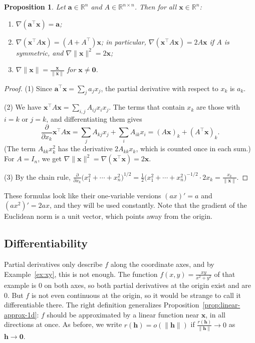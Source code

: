 \documentclass[11pt]{article}
\newcommand{\norm}[1]{\lVert #1 \rVert}
\theoremstyle{definition}
\theoremstyle{plain}
\newtheorem{proposition}[definition]{Proposition}
\theoremstyle{remark}
\begin{document}
\begin{proposition}\label{prop:basic-gradients}
    Let $\mathbf{a} \in \mathbb{R}^n$ and $A \in \mathbb{R}^{n \times n}$. Then for all $\mathbf{x} \in \mathbb{R}^n$:
    \begin{enumerate}
        \item $\nabla (\mathbf{a}^\top \mathbf{x}) = \mathbf{a}$;
        \item $\nabla (\mathbf{x}^\top A \mathbf{x}) = (A + A^\top)\mathbf{x}$; in particular, $\nabla (\mathbf{x}^\top A \mathbf{x}) = 2A\mathbf{x}$ if $A$ is symmetric, and $\nabla \norm{\mathbf{x}}^2 = 2\mathbf{x}$;
        \item $\nabla \norm{\mathbf{x}} = \frac{\mathbf{x}}{\norm{\mathbf{x}}}$ for $\mathbf{x} \neq \mathbf{0}$.
    \end{enumerate}
\end{proposition}

\begin{proof}
    (1) Since $\mathbf{a}^\top \mathbf{x} = \sum_j a_j x_j$, the partial derivative with respect to $x_k$ is $a_k$.

    (2) We have $\mathbf{x}^\top A \mathbf{x} = \sum_{i, j} A_{ij} x_i x_j$. The terms that contain $x_k$ are those with $i = k$ or $j = k$, and differentiating them gives
    \[\frac{\partial}{\partial x_k} \mathbf{x}^\top A \mathbf{x} = \sum_j A_{kj} x_j + \sum_i A_{ik} x_i = (A\mathbf{x})_k + (A^\top \mathbf{x})_k.\]
    (The term $A_{kk} x_k^2$ has the derivative $2A_{kk} x_k$, which is counted once in each sum.) For $A = I_n$, we get $\nabla \norm{\mathbf{x}}^2 = \nabla(\mathbf{x}^\top \mathbf{x}) = 2\mathbf{x}$.

    (3) By the chain rule, $\frac{\partial}{\partial x_k} \big(x_1^2 + \cdots + x_n^2\big)^{1/2} = \frac{1}{2} \big(x_1^2 + \cdots + x_n^2\big)^{-1/2} \cdot 2x_k = \frac{x_k}{\norm{\mathbf{x}}}$.
\end{proof}

These formulas look like their one-variable versions $(ax)' = a$ and $(ax^2)' = 2ax$, and they will be used constantly. Note that the gradient of the Euclidean norm is a unit vector, which points away from the origin.

\subsection{Differentiability}

Partial derivatives only describe $f$ along the coordinate axes, and by Example~\ref{ex:xy}, this is not enough. The function $f(x, y) = \frac{xy}{x^2 + y^2}$ of that example is $0$ on both axes, so both partial derivatives at the origin exist and are $0$. But $f$ is not even continuous at the origin, so it would be strange to call it differentiable there. The right definition generalizes Proposition~\ref{prop:linear-approx-1d}: $f$ should be approximated by a linear function near $\mathbf{x}$, in all directions at once. As before, we write $r(\mathbf{h}) = o(\norm{\mathbf{h}})$ if $\frac{r(\mathbf{h})}{\norm{\mathbf{h}}} \to 0$ as $\mathbf{h} \to \mathbf{0}$.
\end{document}
